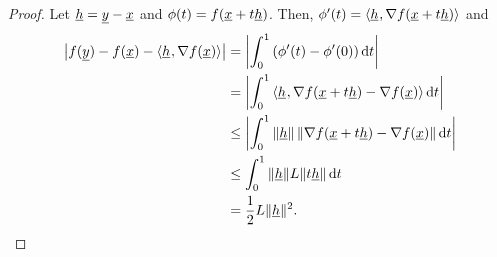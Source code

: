 \begin{proof}
Let $\underline{h} = \underline{y}-\underline{x}$ and $\phi(t) = f(\underline{x} + t \underline{h})$. Then, $\phi'(t) = {\langle  \underline{h}  \mskip1mu ,  \nabla f(\underline{x} + t \underline{h})  \rangle}$ and 
\begin{align*}
\big| f(\underline{y}) -  f(\underline{x}) - {\langle  \underline{h}  \mskip1mu ,  \nabla f(\underline{x})  \rangle} \big| &= \left| \int_{0}^1 \left( \phi'(t) - \phi'(0) \right) \mathrm{d}t \right| \\
&=  \left| \int_{0}^1 {\langle  \underline{h}  \mskip1mu ,  \nabla f(\underline{x} + t \underline{h}) - \nabla f(\underline{x})  \rangle} \, \mathrm{d}t \right| \\
&\leq \left| \int_{0}^1  \| \underline{h} \| \, \| \nabla f(\underline{x} + t \underline{h}) - \nabla f(\underline{x}) \| \, \mathrm{d}t \right| \\
&\leq \int_{0}^1 \|\underline{h} \| L \| t \underline{h} \| \, \mathrm{d}t \\
&= \frac{1}{2} L \| \underline{h} \|^2. \qedhere
\end{align*}
\end{proof}

